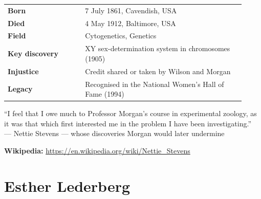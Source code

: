 \documentclass[12pt,a4paper]{article}
\makeatletter
\newcommand{\keyfacts}[1]{%
  \begin{tcolorbox}[factbox, title={Key Facts}]
  \begin{tabular}{@{}p{0.3\linewidth}p{0.62\linewidth}@{}}
  #1
  \end{tabular}
  \end{tcolorbox}
}
\newcommand{\pullquote}[2]{%
  \begin{tcolorbox}[quotebox]
  ``#1''\\[4pt]
  {\small\normalfont\color{medgray}--- #2}
  \end{tcolorbox}
}
\makeatother
\begin{document}
\keyfacts{
\textbf{Born} & 7 July 1861, Cavendish, USA\\[3pt]
\textbf{Died} & 4 May 1912, Baltimore, USA\\[3pt]
\textbf{Field} & Cytogenetics, Genetics\\[3pt]
\textbf{Key discovery} & XY sex-determination system in chromosomes (1905)\\[3pt]
\textbf{Injustice} & Credit shared or taken by Wilson and Morgan\\[3pt]
\textbf{Legacy} & Recognised in the National Women's Hall of Fame (1994)\\
}

\pullquote{I feel that I owe much to Professor Morgan's course in experimental zoology, as it was that which first interested me in the problem I have been investigating.}{Nettie Stevens — whose discoveries Morgan would later undermine}

\textbf{Wikipedia:} \url{https://en.wikipedia.org/wiki/Nettie_Stevens}

\newpage

\section{Esther Lederberg}
\end{document}
